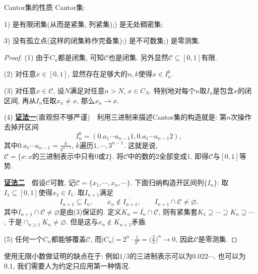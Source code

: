 \begin{proposition}{Cantor集的性质}
	Cantor集: 
	
	1) 是有限闭集(从而是紧集, 列紧集);) 是无处稠密集;
	
	3) 没有孤立点(这样的闭集称作完备集);) 是不可数集;) 是零测集. 
\end{proposition}
\begin{proof}
	(1) 由于$C_n$都是闭集, 可知$\mathcal{C}$也是闭集. 另外显然$\mathcal{C} \subseteq [0,1]$有限. 
	
	(2) 对任意$x \in [0,1]$, 显然存在足够大的$n,k$使得$x \in I_n^k$. 
	
	(3) 对任意$x \in \mathcal{C}$, 设$N$满足对任意$n>N$, $x \in C_N$. 特别地对每个$n$取$I_n$是包含$x$的闭区间, 再从$I_n$任取$x_n \neq x$, 那么$x_n \to x$. 
	
	(4) \underline{\textbf{证法一}}(直观但不够严谨)~~利用三进制来描述Cantor集的构造就是: 第$n$次操作去掉开区间$$I_n^k =  (0.a_1\cdots a_{n-1}1, 0.a_1\cdots a_{n-1}2),$$其中$0.a_1\cdots a_{n-1}=\frac{k}{3^{n-1}}$, $k$遍历$1,\cdots ,3^{n-1}$. 这就是说, $\mathcal{C} = \{ x:x\textit{的三进制表示中只有$0$或$2$} \}$. 将$\mathcal{C}$中的数的$2$全部变成$1$, 即得$\mathcal{C}$与$[0,1]$等势. 
	
	\underline{\textbf{证法二}}~~假设$\mathcal{C}$可数, 记$\mathcal{C} = \{ x_1,\cdots ,x_n,\cdots \}$. 下面归纳构造开区间列$\{ I_n \}$: 取$I_1 \subseteq [0,1]$使得$x_1 \in I_1$. 取$I_{n+1}$满足$$\overline{I_{n+1}} \subseteq I_n,\qquad x_n \notin \overline{I_{n+1}},\qquad I_{n+1} \cap \mathcal{C} \neq \varnothing .$$
	其中$I_{n+1} \cap \mathcal{C} \neq \varnothing$是由(3)保证的. 定义$K_n = \overline{I_n} \cap \mathcal{C}$, 则有紧集套$K_1 \supseteq \cdots \supseteq K_n \supseteq \cdots$, 于是$\cap_{n \geq 1}K_n \neq \varnothing$. 但是这与$x_n \notin K_{n+1}$矛盾. 
	
	(5) 任何一个$C_n$都能够覆盖$\mathcal{C}$, 而$|C_n| = 2^n \cdot \frac{1}{3^n} = \big( \frac{2}{3} \big)^n \to 0$, 因此$\mathcal{C}$是零测集. 
\end{proof}
\begin{remark}
	使用无限小数做证明的缺点在于: 例如$1/3$的三进制表示可以为$0.022\cdots$, 也可以为$0.1$, 我们需要人为约定只应用第一种情况. 
\end{remark}











